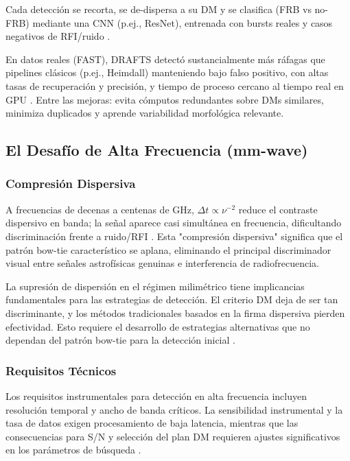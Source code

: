 Cada detección se recorta, se de-dispersa a su DM y se clasifica (FRB vs no-FRB) mediante una CNN (p.ej., ResNet), entrenada con bursts reales y casos negativos de RFI/ruido \citep{Agarwal_2020,zhang2024drafts}.

En datos reales (FAST), DRAFTS detectó sustancialmente más ráfagas que pipelines clásicos (p.ej., Heimdall) manteniendo bajo falso positivo, con altas tasas de recuperación y precisión, y tiempo de proceso cercano al tiempo real en GPU \citep{zhang2024drafts,Heimdall_Use}. Entre las mejoras: evita cómputos redundantes sobre DMs similares, minimiza duplicados y aprende variabilidad morfológica relevante.

\subsection{El Desafío de Alta Frecuencia (mm-wave)}

\subsubsection{Compresión Dispersiva}

A frecuencias de decenas a centenas de GHz, $\Delta t\propto \nu^{-2}$ reduce el contraste dispersivo en banda; la señal aparece casi simultánea en frecuencia, dificultando discriminación frente a ruido/RFI \citep{LorimerKramer2004,CordesChatterjee2019}. Esta "compresión dispersiva" significa que el patrón bow-tie característico se aplana, eliminando el principal discriminador visual entre señales astrofísicas genuinas e interferencia de radiofrecuencia.

La supresión de dispersión en el régimen milimétrico tiene implicancias fundamentales para las estrategias de detección. El criterio DM deja de ser tan discriminante, y los métodos tradicionales basados en la firma dispersiva pierden efectividad. Esto requiere el desarrollo de estrategias alternativas que no dependan del patrón bow-tie para la detección inicial \citep{veracasanova2025}.

\subsubsection{Requisitos Técnicos}

Los requisitos instrumentales para detección en alta frecuencia incluyen resolución temporal y ancho de banda críticos. La sensibilidad instrumental y la tasa de datos exigen procesamiento de baja latencia, mientras que las consecuencias para S/N y selección del plan DM requieren ajustes significativos en los parámetros de búsqueda \citep{veracasanova2025}.

